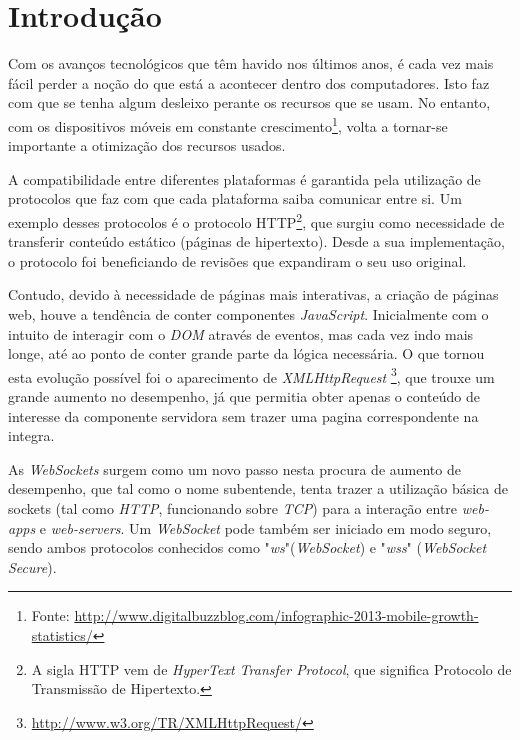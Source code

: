 \documentclass[a4paper]{article}
\begin{document}

\newpage
\thispagestyle{empty} %

\tableofcontents

\newpage
\setcounter{page}{1} %

\section{Introdução}

Com os avanços tecnológicos que têm havido nos últimos anos, é cada vez mais fácil perder a noção
do que está a acontecer dentro dos computadores. Isto faz com que se tenha algum desleixo perante os recursos que se usam. No entanto, com os dispositivos móveis em constante crescimento\footnote{Fonte: \url{http://www.digitalbuzzblog.com/infographic-2013-mobile-growth-statistics/}}, volta a tornar-se importante a otimização dos recursos usados.

A compatibilidade entre diferentes plataformas é garantida pela utilização de protocolos que faz com que cada plataforma saiba comunicar entre si. Um exemplo desses protocolos é o protocolo HTTP\footnote{A sigla HTTP vem de \emph{HyperText Transfer Protocol}, que significa Protocolo de Transmissão de Hipertexto.}, que surgiu como necessidade de transferir conteúdo estático (páginas de hipertexto). Desde a sua implementação, o protocolo foi beneficiando de revisões que expandiram o seu uso original.

Contudo, devido à necessidade de páginas mais interativas, a criação de páginas web, houve a tendência de conter componentes \emph{JavaScript}. Inicialmente com o intuito de interagir com o \emph{DOM} através de eventos, mas cada vez indo mais longe, até ao ponto de conter grande parte da lógica necessária. O que tornou esta evolução possível foi o aparecimento de \emph{XMLHttpRequest} \footnote{\url{http://www.w3.org/TR/XMLHttpRequest/}}, que trouxe um grande aumento no desempenho, já que permitia obter apenas o conteúdo de interesse da componente servidora sem trazer uma pagina correspondente na integra.

As \emph{WebSockets} surgem como um novo passo nesta procura de aumento de desempenho, que tal como o nome subentende, tenta trazer a utilização básica de sockets (tal como \emph{HTTP}, funcionando sobre \emph{TCP}) para a interação entre \emph{web-apps} e \emph{web-servers}. Um \emph{WebSocket} pode também ser iniciado em modo seguro, sendo ambos protocolos conhecidos como "\emph{ws}"(\emph{WebSocket}) e "\emph{wss}" (\emph{WebSocket Secure}).
\end{document}

